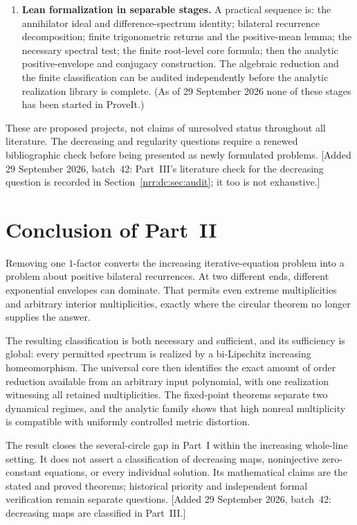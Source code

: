 \documentclass[11pt,letterpaper]{article}
\theoremstyle{definition}
\theoremstyle{remark}
\begin{document}
\begin{enumerate}[label=\textbf{Q\arabic*.},leftmargin=3.2em,itemsep=0.8em]
\item \textbf{Lean formalization in separable stages.}
A practical sequence is: the annihilator ideal and difference-spectrum
identity; bilateral recurrence decomposition; finite trigonometric
returns and the positive-mean lemma; the necessary spectral test; the
finite root-level core formula; then the analytic positive-envelope and
conjugacy construction. The algebraic reduction and the finite
classification can be audited independently before the analytic
realization library is complete. (As of 29 September 2026 none of these
stages has been started in ProveIt.)
\end{enumerate}

These are proposed projects, not claims of unresolved status throughout
all literature. The decreasing and regularity questions require a renewed
bibliographic check before being presented as newly formulated problems.
[Added 29 September 2026, batch~42: Part~III's literature check for the
decreasing question is recorded in Section~\ref{nrr:dc:sec:audit}; it too is
not exhaustive.]

\section{Conclusion of Part~II}
\label{nrr:sc:sec:conclusion}

Removing one $1$-factor converts the increasing iterative-equation problem
into a problem about positive bilateral recurrences. At two different
ends, different exponential envelopes can dominate. That permits even
extreme multiplicities and arbitrary interior multiplicities, exactly
where the circular theorem no longer supplies the answer.

The resulting classification is both necessary and sufficient, and its
sufficiency is global: every permitted spectrum is realized by a
bi-Lipschitz increasing homeomorphism. The universal core then identifies
the exact amount of order reduction available from an arbitrary input
polynomial, with one realization witnessing all retained multiplicities.
The fixed-point theorems separate two dynamical regimes, and the analytic
family shows that high nonreal multiplicity is compatible with uniformly
controlled metric distortion.

The result closes the several-circle gap in Part~I within the increasing
whole-line setting. It does not assert a classification of decreasing maps,
noninjective zero-constant equations, or every individual solution. Its
mathematical claims are the stated and proved theorems; historical priority
and independent formal verification remain separate questions.
[Added 29 September 2026, batch~42: decreasing maps are classified in
Part~III.]
\end{document}
